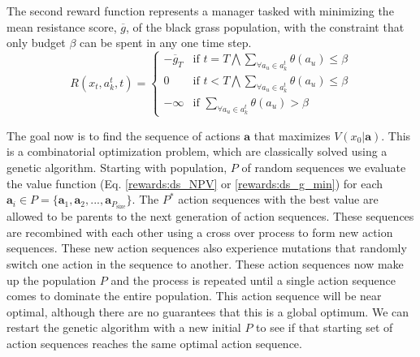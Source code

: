 \documentclass[12pt, a4paper]{article}
\begin{document}
The second reward function represents a manager tasked with minimizing the mean resistance score, $\overline{g}$, of the black grass population, with the constraint that only budget $\beta$ can be spent in any one time step. 
\begin{equation}\label{rewards:ds_g_min}
	R(x_t, a_k^t, t) = \begin{cases}
	-\overline{g}_T &\text{if } t = T \bigwedge \sum_{\forall a_u \in a_k^t} \theta(a_u) \leq \beta \\
	0 &\text{if } t < T \bigwedge \sum_{\forall a_u \in a_k^t} \theta(a_u) \leq \beta \\
	-\infty &\text{if } \sum_{\forall a_u \in a_k^t} \theta(a_u) > \beta     
	\end{cases}  
\end{equation}

The goal now is to find the sequence of actions $\mathbf{a}$ that maximizes $V(x_0|\mathbf{a})$. This is a combinatorial optimization problem, which are classically solved using a genetic algorithm. Starting with population, $P$ of random sequences we evaluate the value function (Eq. \ref{rewards:ds_NPV} or \ref{rewards:ds_g_min}) for each $\mathbf{a}_i \in P = \{\mathbf{a}_1, \mathbf{a}_2, ..., \mathbf{a}_{P_\text{size}}\}$. The $P^*$ action sequences with the best value are allowed to be parents to the next generation of action sequences. These sequences are recombined with each other using a cross over process to form new action sequences. These new action sequences also experience mutations that randomly switch one action in the sequence to another. These action sequences now make up the population $P$ and the process is repeated until a single action sequence comes to dominate the entire population. This action sequence will be near optimal, although there are no guarantees that this is a global optimum. We can restart the genetic algorithm with a new initial $P$ to see if that starting set of action sequences reaches the same optimal action sequence. 
\end{document}
